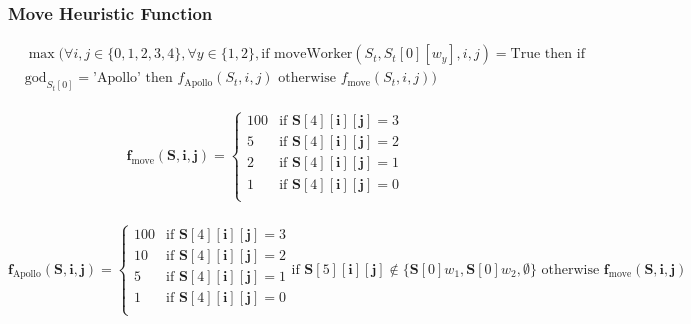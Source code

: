 \documentclass{telkomnika}
\begin{document}
\subsubsection {Move Heuristic Function}
\begin{equation}
 \begin{aligned}
    &\max(\forall i,j \in \{0, 1, 2, 3, 4\}, \forall y \in \{1, 2\},\text{if } \text{moveWorker}(S_t, S_t[0][w_y], i, j) = \text{True} \text{ then if } \\
    &\text{god}_{S_t[0]} = \text{'Apollo'} \text{ then } f_{\text{Apollo}}(S_t, i, j) \text{ otherwise } f_{\text{move}}(S_t, i, j) )
 \end{aligned}
\label{eq:move_max_heur}
\end{equation}

\begin{equation}
 \begin{aligned}
    &\mathbf{f}_{\text{move}}(\mathbf{S}, \mathbf{i}, \mathbf{j}) = \left\{
\begin{array}{cl}
100 & \text{if } \mathbf{S}[4][\mathbf{i}][\mathbf{j}] = 3 \\
5 & \text{if } \mathbf{S}[4][\mathbf{i}][\mathbf{j}] = 2 \\
2 & \text{if } \mathbf{S}[4][\mathbf{i}][\mathbf{j}] = 1 \\
1 & \text{if } \mathbf{S}[4][\mathbf{i}][\mathbf{j}] = 0 \\
\end{array}
\right.\\
 \end{aligned}
\label{eq:move_norm_heur}
\end{equation}

\begin{equation}
\mathbf{f}_{\text{Apollo}}(\mathbf{S}, \mathbf{i}, \mathbf{j}) = \left\{
\begin{array}{cl}
100 & \text{if } \mathbf{S}[4][\mathbf{i}][\mathbf{j}] = 3 \\
10 & \text{if } \mathbf{S}[4][\mathbf{i}][\mathbf{j}] = 2 \\
5 & \text{if } \mathbf{S}[4][\mathbf{i}][\mathbf{j}] = 1 \\
1 & \text{if } \mathbf{S}[4][\mathbf{i}][\mathbf{j}] = 0 \\
\end{array}
\right. \text{if } \mathbf{S}[5][\mathbf{i}][\mathbf{j}] \notin \{\mathbf{S}[0]w_1, \mathbf{S}[0]w_2, \emptyset\}
\text{ otherwise }
\mathbf{f}_{\text{move}}(\mathbf{S}, \mathbf{i}, \mathbf{j})
\label{eq:move_appolo_heur}
\end{equation}
\end{document}
